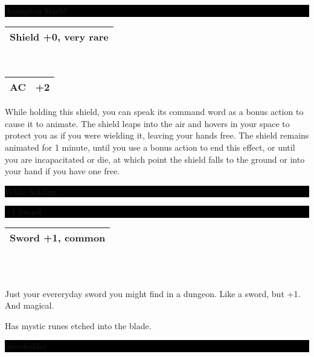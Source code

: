 \documentclass{article}
\begin{document}
    \setlength\parindent{0pt}
    
    \colorbox{black}{\parbox{\textwidth}{\color{white} \centering 
        Animated Shield
    }}
    \begin{tabularx}{\textwidth}{ >{\centering\arraybackslash}X }
        Shield +0, very rare\\\hline
    \end{tabularx}\\[-0.4mm]
    \begin{tabularx}{\textwidth}{ m{7.5mm} | X }
         
        \footnotesize AC  & \footnotesize +2 \\\hline
        
    \end{tabularx}
    \vfill
    \hspace{.05\textwidth}\parbox{.9\textwidth}{
    \footnotesize
    While holding this shield, you can speak its command word as a bonus action to cause it to animate. The shield leaps into the air and hovers in your space to protect you as if you were wielding it, leaving your hands free. The shield remains animated for 1 minute, until you use a bonus action to end this effect, or until you are incapacitated or die, at which point the shield falls to the ground or into your hand if you have one free.
    }
    \vfill

    \colorbox{black}{\parbox{\textwidth}{\color{white}
    \centering 
    While holding 
    }}
    \newpage
    
    \colorbox{black}{\parbox{\textwidth}{\color{white} \centering 
        +1 Sword
    }}
    \begin{tabularx}{\textwidth}{ >{\centering\arraybackslash}X }
        Sword +1, common\\\hline
    \end{tabularx}\\[-0.4mm]
    \begin{tabularx}{\textwidth}{ m{7.5mm} | X }
        
    \end{tabularx}
    \vfill
    \hspace{.05\textwidth}\parbox{.9\textwidth}{
    \footnotesize
    Just your evereryday sword you might find in a dungeon. Like a sword, but +1. And magical.

Has mystic runes etched into the blade.


    }
    \vfill

    \colorbox{black}{\parbox{\textwidth}{\color{white}
    \centering 
     \color{black}placeholder
    }}
    \newpage
    
\end{document}
